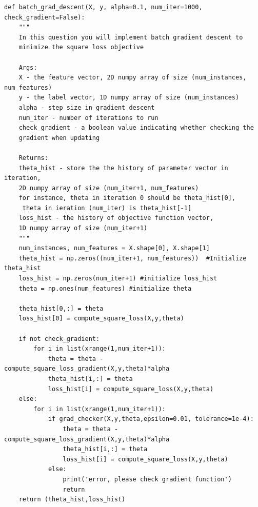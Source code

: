 \documentclass{article}
\newenvironment{problem}[2][$\bullet$]{\begin{trivlist}\large
		\item[\hskip \labelsep {\bfseries #1}\hskip \labelsep {\bfseries #2.}]}  {\end{trivlist}}
\newenvironment{sub}[2][$-$]{\begin{trivlist}
		\item[\hskip \labelsep {\bfseries #1}\hskip \labelsep {\bfseries #2.}]}  {\end{trivlist}}
\begin{document}
\begin{problem}{2.4 Batch Gradient Descent}
\end{problem}

\begin{sub}{2.4.1}
\end{sub}

\begin{verbatim}
def batch_grad_descent(X, y, alpha=0.1, num_iter=1000, check_gradient=False):
	"""
	In this question you will implement batch gradient descent to
	minimize the square loss objective
	
	Args:
	X - the feature vector, 2D numpy array of size (num_instances, num_features)
	y - the label vector, 1D numpy array of size (num_instances)
	alpha - step size in gradient descent
	num_iter - number of iterations to run 
	check_gradient - a boolean value indicating whether checking the 
	gradient when updating
	
	Returns:
	theta_hist - store the the history of parameter vector in iteration,
	2D numpy array of size (num_iter+1, num_features) 
	for instance, theta in iteration 0 should be theta_hist[0],
	 theta in ieration (num_iter) is theta_hist[-1]
	loss_hist - the history of objective function vector, 
	1D numpy array of size (num_iter+1) 
	"""
    num_instances, num_features = X.shape[0], X.shape[1]
    theta_hist = np.zeros((num_iter+1, num_features))  #Initialize theta_hist
    loss_hist = np.zeros(num_iter+1) #initialize loss_hist
    theta = np.ones(num_features) #initialize theta
    
    theta_hist[0,:] = theta
    loss_hist[0] = compute_square_loss(X,y,theta)
    
    if not check_gradient:
	    for i in list(xrange(1,num_iter+1)):
		    theta = theta - compute_square_loss_gradient(X,y,theta)*alpha
		    theta_hist[i,:] = theta 
		    loss_hist[i] = compute_square_loss(X,y,theta)
    else:
	    for i in list(xrange(1,num_iter+1)): 
		    if grad_checker(X,y,theta,epsilon=0.01, tolerance=1e-4):
			    theta = theta - compute_square_loss_gradient(X,y,theta)*alpha
			    theta_hist[i,:] = theta 
			    loss_hist[i] = compute_square_loss(X,y,theta)        
		    else:
			    print('error, please check gradient function')
			    return 
    return (theta_hist,loss_hist)

\end{verbatim}

\begin{sub}{2.4.2}
\end{sub}
\end{document}
